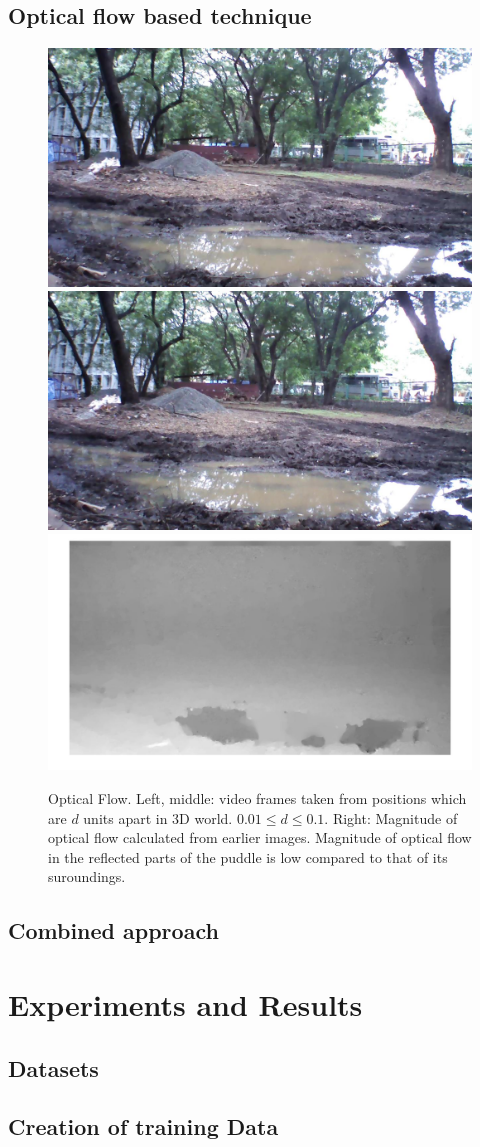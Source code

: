 \documentclass[times,10pt,twocolumn,letterpaper]{article}
\begin{document}
\subsection{Optical flow based technique}
\begin{figure}[h!]
\centering
\includegraphics[width=0.3\linewidth]{images/IMG_PAIR_1_1.jpg}
\includegraphics[width=0.3\linewidth]{images/IMG_PAIR_1_2.jpg}
\includegraphics[width=0.3\linewidth]{images/optical_flow_magnitude.jpg}
\caption{Optical Flow. Left, middle: video frames taken from positions
which are $d$ units apart in 3D world. $ 0.01 \leq d \leq 0.1$. Right:
Magnitude of optical flow calculated from earlier images. Magnitude of optical
flow in the reflected parts of the puddle is low compared to that of its
suroundings.}
\end{figure}
\cite{Liu11Thesis}


\cite{Liu11} 
\subsection{Combined approach}

\section{Experiments and Results}
\subsection{Datasets}
\subsection{Creation of training Data}
\end{document}
